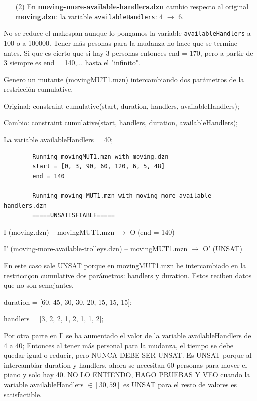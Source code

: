 \begin{itemize}
    \item[(2)] En \textbf{moving-more-available-handlers.dzn} cambio respecto al original \textbf{moving.dzn}:  la variable \texttt{availableHandlers}: 4 $\rightarrow$ 6.
\end{itemize}   
        
        No se reduce el makespan aunque lo pongamos la variable \texttt{availableHandlers} a 100 o a 100000. 
        Tener más pesonas para la mudanza no hace que se termine antes. Si que es cierto que si hay 3 personas entonces end = 170, pero a partir de 3 siempre es end = 140,... hasta el "infinito".
        
\medskip



        
        Genero un mutante (movingMUT1.mzn) intercambiando dos parámetros de la restricción cumulative.
        
Original: constraint cumulative(start, duration, handlers, availableHandlers);

Cambio: constraint cumulative(start, handlers, duration, availableHandlers);

La variable availableHandlers = 40;

        \begin{lstlisting}
        Running movingMUT1.mzn with moving.dzn
        start = [0, 3, 90, 60, 120, 6, 5, 48]
        end = 140
        
        Running moving-MUT1.mzn with moving-more-available-handlers.dzn
        =====UNSATISFIABLE=====
        \end{lstlisting}

\begin{framed}
I (moving.dzn) -- movingMUT1.mzn $\rightarrow$ O (end = 140)

I' (moving-more-available-trolleys.dzn) -- movingMUT1.mzn $\rightarrow$ O' (UNSAT)
\end{framed}    




En este caso sale UNSAT porque en movingMUT1.mzn he intercambiado en la restricciçon cumulative dos parámetros: handlers y duration. Estos reciben datos que no son semejantes, 

duration = [60, 45, 30, 30, 20, 15, 15, 15];

handlers = [3, 2, 2, 1, 2, 1, 1, 2];



Por otra parte en I' se ha aumentado el valor de la variable availableHandlers de 4 a 40; Entonces al tener más personal para la mudanza, el tiempo se debe quedar igual o reducir, pero NUNCA DEBE SER UNSAT. 
Es UNSAT porque al intercambiar duration y handlers, ahora se necesitan 60 personas para mover el piano y solo hay 40.
NO LO ENTIENDO, HAGO PRUEBAS Y VEO cuando la variable availableHandlers $\in [30, 59]$ es UNSAT para el resto de valores es satisfactible.

